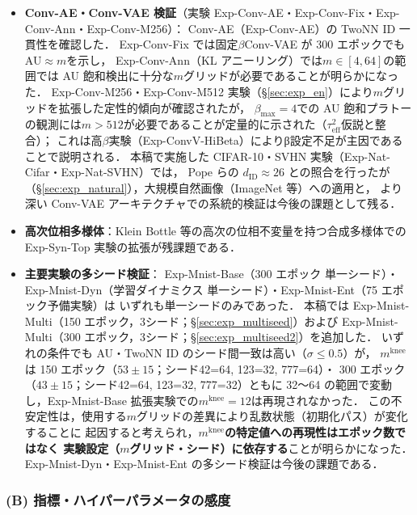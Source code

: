 \documentclass[11pt,a4paper]{jsarticle}
\newcommand{\mknee}{m^{\mathrm{knee}}}
\begin{document}
\begin{itemize}
  \item \textbf{Conv-AE・Conv-VAE 検証}（実験 Exp-Conv-AE・Exp-Conv-Fix・Exp-Conv-Ann・Exp-Conv-M256）：
        Conv-AE（Exp-Conv-AE）の TwoNN ID 一貫性を確認した．
        Exp-Conv-Fix では固定$\beta$Conv-VAE が 300 エポックでも AU$\approx m$を示し，
        Exp-Conv-Ann（KL アニーリング）では$m\in[4,64]$の範囲では AU 飽和検出に十分な$m$グリッドが必要であることが明らかになった．
        Exp-Conv-M256・Exp-Conv-M512 実験（§\ref{sec:exp_en}）により$m$グリッドを拡張した定性的傾向が確認されたが，
        $\beta_{\max}=4$での AU 飽和プラトーの観測には$m>512$が必要であることが定量的に示された（$\tau^2_\mathrm{eff}$仮説と整合）；
        これは高$\beta$実験（Exp-ConvV-HiBeta）によりβ設定不足が主因であることで説明される．
        本稿で実施した CIFAR-10・SVHN 実験（Exp-Nat-Cifar・Exp-Nat-SVHN）では，
        Pope ら\cite{pope2021intrinsic}の $d_\mathrm{ID} \approx 26$ との照合を行ったが
        （§\ref{sec:exp_natural}），大規模自然画像（ImageNet 等）への適用と，
        より深い Conv-VAE アーキテクチャでの系統的検証は今後の課題として残る．
  \item \textbf{高次位相多様体}：Klein Bottle 等の高次の位相不変量を持つ合成多様体での
        Exp-Syn-Top 実験の拡張が残課題である．
  \item \textbf{主要実験の多シード検証}：
        Exp-Mnist-Base（300 エポック 単一シード）・Exp-Mnist-Dyn（学習ダイナミクス 単一シード）・Exp-Mnist-Ent（75 エポック予備実験）は
        いずれも単一シードのみであった．
        本稿では Exp-Mnist-Multi（150 エポック，3シード；§\ref{sec:exp_multiseed}）および
        Exp-Mnist-Multi（300 エポック，3シード；§\ref{sec:exp_multiseed2}）を追加した．
        いずれの条件でも AU・TwoNN ID のシード間一致は高い（$\sigma \leq 0.5$）が，
        $\mknee$は 150 エポック（$53 \pm 15$；シード42=64, 123=32, 777=64）・
        300 エポック（$43 \pm 15$；シード42=64, 123=32, 777=32）ともに
        32〜64 の範囲で変動し，Exp-Mnist-Base 拡張実験での$\mknee = 12$は再現されなかった．
        この不安定性は，使用する$m$グリッドの差異により乱数状態（初期化パス）が変化することに
        起因すると考えられ，\textbf{$\mknee$の特定値への再現性はエポック数ではなく
        実験設定（$m$グリッド・シード）に依存する}ことが明らかになった．
        Exp-Mnist-Dyn・Exp-Mnist-Ent の多シード検証は今後の課題である．
\end{itemize}

\subsubsection*{(B) 指標・ハイパーパラメータの感度}
\end{document}
